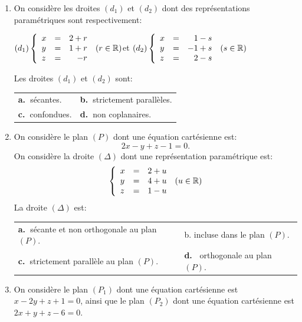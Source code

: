 \documentclass[10pt]{article}
\providecommand{\R}{\mathbb{R}}
\begin{document}
\begin{enumerate}[resume]
\item On considère les droites $\left(d_1\right)$ et $\left(d_2\right)$ dont des représentations paramétriques sont respectivement:
\begin{center}
$\left(d_1\right)\left\{\begin{array}{l c r}
x&=&2+r\\
y&=&1 + r\\
z&=&- r
\end{array}\right. \:(r \in \R)$\quad et 
$\left(d_2\right)\left\{\begin{array}{l c l}
x&=&\phantom{-}1 - s\\
y&=&-1 + s\\
z&=&\phantom{-}2 - s
\end{array}\right. \:(s \in \R)$\end{center}

Les droites $\left(d_1\right)$ et $\left(d_2\right)$  sont: 
\begin{center}
\begin{tabularx}{\linewidth}{X X}
\textbf{a.~}sécantes.&\textbf{b.~}strictement parallèles.\\
\textbf{c.~}confondues.&\textbf{d.~}non coplanaires.
\end{tabularx}
\end{center}
\item 
On considère le plan $(P)$ dont une équation cartésienne est: 
\[2x - y + z - 1 = 0.\]
On considère la droite $(\Delta)$ dont une représentation paramétrique est:
\[\left\{\begin{array}{l c r}
x&=&2 + u\\
y&=&4 + u\\
z&=&1 - u
\end{array}\right. \:(u \in \R)\]
La droite $(\Delta)$  est:

\begin{center}
\begin{tabularx}{\linewidth}{X X}
\textbf{a.~}sécante et non orthogonale\newline \hspace*{0.3cm} au plan $(P)$.&b. incluse dans le plan $(P)$.\\
\textbf{c.~}strictement parallèle au plan $(P)$.&\textbf{d.~} orthogonale au plan $(P)$.
\end{tabularx}
\end{center}

\item On considère le plan $\left(P_1\right)$ dont une équation cartésienne est $x - 2y + z + 1 = 0$, ainsi que le plan $\left(P_2\right)$ dont une équation cartésienne est $2x + y + z - 6 = 0$.


\end{enumerate}
\end{document}
